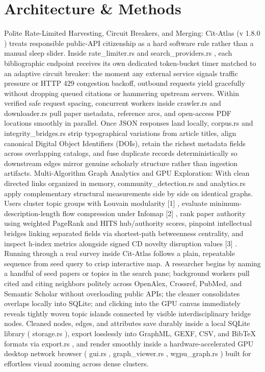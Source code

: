 \documentclass[10pt,letterpaper]{article}
\begin{document}
\section{Architecture \& Methods}
Polite Rate-Limited Harvesting, Circuit Breakers, and Merging: Cit-Atlas (v 1.8.0 ) treats responsible public-API citizenship as a hard software rule rather than a manual sleep slider. Inside rate\_limiter.rs and search\_providers.rs , each bibliographic endpoint receives its own dedicated token-bucket timer matched to an adaptive circuit breaker: the moment any external service signals traffic pressure or HTTP 429 congestion backoff, outbound requests yield gracefully without dropping queued citations or hammering upstream servers. Within verified safe request spacing, concurrent workers inside crawler.rs and downloader.rs pull paper metadata, reference arcs, and open-access PDF locations smoothly in parallel. Once JSON responses land locally, corpus.rs and integrity\_bridges.rs strip typographical variations from article titles, align canonical Digital Object Identifiers (DOIs), retain the richest metadata fields across overlapping catalogs, and fuse duplicate records deterministically so downstream edges mirror genuine scholarly structure rather than ingestion artifacts. Multi-Algorithm Graph Analytics and GPU Exploration: With clean directed links organized in memory, community\_detection.rs and analytics.rs apply complementary structural measurements side by side on identical graphs. Users cluster topic groups with Louvain modularity [1] , evaluate minimum-description-length flow compression under Infomap [2] , rank paper authority using weighted PageRank and HITS hub/authority scores, pinpoint intellectual bridges linking separated fields via shortest-path betweenness centrality, and inspect h-index metrics alongside signed CD novelty disruption values [3] . Running through a real survey inside Cit-Atlas follows a plain, repeatable sequence from seed query to crisp interactive map. A researcher begins by naming a handful of seed papers or topics in the search pane; background workers pull cited and citing neighbors politely across OpenAlex, Crossref, PubMed, and Semantic Scholar without overloading public APIs; the cleaner consolidates overlaps locally into SQLite; and clicking into the GPU canvas immediately reveals tightly woven topic islands connected by visible interdisciplinary bridge nodes. Cleaned nodes, edges, and attributes save durably inside a local SQLite library ( storage.rs ), export losslessly into GraphML, GEXF, CSV, and BibTeX formats via export.rs , and render smoothly inside a hardware-accelerated GPU desktop network browser ( gui.rs , graph\_viewer.rs , wgpu\_graph.rs ) built for effortless visual zooming across dense clusters.
\end{document}
